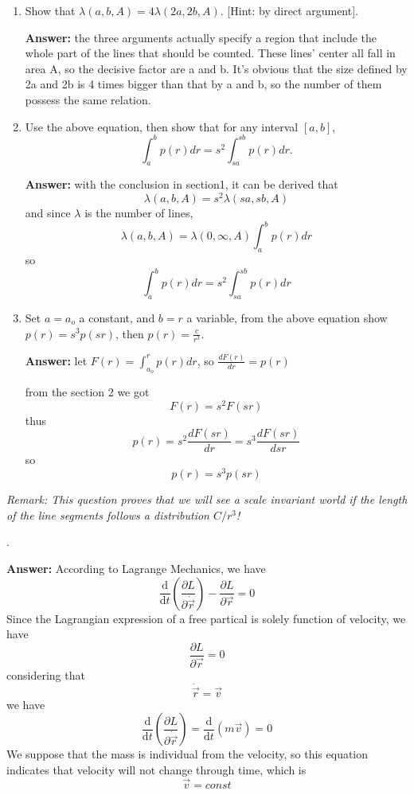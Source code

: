 \documentclass[11pt]{article}
\begin{document}
\begin{enumerate}
\item Show that $\lambda(a,b,A) = 4\lambda(2a,2b,A)$. [Hint: by direct argument].

\textbf{Answer:}
the three arguments actually specify a region that include the whole part of the lines that should be counted. These lines' center all fall in area A, so the decisive factor are a and b. It's obvious that the size defined by 2a and 2b is 4 times bigger than that by a and b, so the number of them possess the same relation.

\item Use the above equation, then show that for any interval $[a,b]$,
\[
     \int_a^b p(r)dr = s^2  \int_{sa}^{sb} p(r)dr.
\]

\textbf{Answer:}
with the conclusion in section1, it can be derived that
$$
\lambda(a,b,A)=s^2\lambda(sa,sb,A)
$$
and since $\lambda$ is the number of lines,
$$
\lambda(a,b,A) = \lambda(0,\infty,A)\int_{a}^{b}p(r)dr
$$
so
$$
\int_a^b p(r)dr = s^2  \int_{sa}^{sb} p(r)dr
$$

\item Set $a=a_o$ a constant, and $b=r$ a variable, from the above equation
show $p(r)=s^3 p(sr)$, then $p(r)=\frac{c}{r^3}$.

\textbf{Answer:}
let $F(r)=\int_{a_o}^{r}p(r)dr$, so $\frac{dF(r)}{dr}=p(r)$

from the section 2 we got
$$
F(r)=s^2F(sr)
$$
thus
$$
p(r) = s^2\frac{dF(sr)}{dr} = s^3\frac{dF(sr)}{dsr}
$$
so
$$
p(r) = s^3p(sr)
$$
\end{enumerate}
{\em Remark: This question proves that we will see a scale invariant
world if the length of the line segments follows a distribution
$C/r^3$! }

.

\textbf{Answer:}
According to Lagrange Mechanics, we have
$$
\frac{\mathrm{d}}{\mathrm{d}t}(\frac{\partial L}{\partial \dot{\vec{r}}})-\frac{\partial L}{\partial \vec{r}}=0
$$
Since the Lagrangian expression of a free partical is solely function of velocity, we have
$$
\frac{\partial L}{\partial \vec{r}}=0
$$
considering that 
$$
\dot{\vec{r}}=\vec{v}
$$
we have
$$
\frac{\mathrm{d}}{\mathrm{d}t}(\frac{\partial L}{\partial \dot{\vec{r}}})=\frac{\mathrm{d}}{\mathrm{d}t}(m\vec{v})=0
$$
We suppose that the mass is individual from the velocity, so this equation indicates that velocity will not change through time, which is
$$
\vec{v}=const
$$
\end{document}
